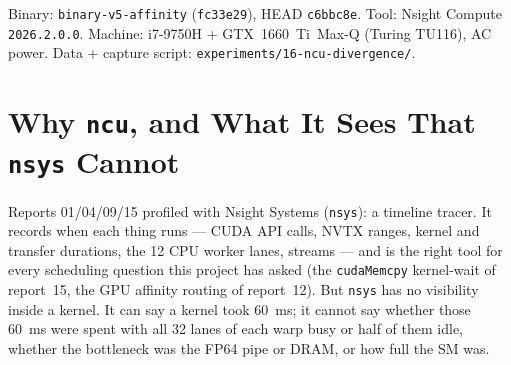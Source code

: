 \documentclass[
	english,
	letterpaper, oneside
]{article}
\begin{document}
\templatePagecfg
\templateFinalcfg

\inserttitle

\begin{center}\small\textsf{%
Binary: \texttt{binary-v5-affinity} (\texttt{fc33e29}), HEAD \texttt{c6bbc8e}.
Tool: Nsight Compute \texttt{2026.2.0.0}. Machine: i7-9750H + GTX~1660~Ti~Max-Q
(Turing TU116), AC power. Data + capture script:
\texttt{experiments/16-ncu-divergence/}.%
}\end{center}

\begin{abstract}
This report uses NVIDIA Nsight Compute (\texttt{ncu}) to measure, for the first
time in this project, what happens inside the GPU kernel --- warp
execution efficiency, branch divergence, FP64 pipe utilisation, occupancy, and
the compute/memory roofline --- across four content regimes (interior, exterior,
boundary, canonical), each run GPU-only so the single GPU thread is forced to
process every region type. The headline: the coherent regions the affinity
queue actually routes to the GPU run at exactly 100.0\,\% warp execution
efficiency and 100.0\,\% branch efficiency --- zero divergence, now measured
rather than argued (\texttt{11-priority-queue.tex}). They are FP64-bound
at 85.6\,\% of the double-precision peak ($\sim$110 of 129~GFLOPS at the measured
1.34~GHz on the 1:32 TU116), at 98.9\,\% occupancy with $\sim$0\,\% memory
traffic; the 15\,\% gap is the dependent iteration recurrence (long-scoreboard
stalls, uniform across all regimes), not divergence. Divergence is real
but confined to the pixel-floor boundary leaves (240$\times$135 down to
33.7\,\%; 480$\times$270 leaves 99.9\,\%): the uniformity test doubles as a
coherence filter. This corrects report~11's $\sim$40\,\% FP64 estimate and closes
the divergence question --- the GPU lever was never divergence.
\end{abstract}

\section{Why \texttt{ncu}, and What It Sees That \texttt{nsys} Cannot}

Reports 01/04/09/15 profiled with Nsight Systems (\texttt{nsys}): a
timeline tracer. It records when each thing runs --- CUDA API calls, NVTX
ranges, kernel and transfer durations, the 12 CPU worker lanes, streams
--- and is the right tool for every scheduling question this project has
asked (the \texttt{cudaMemcpy} kernel-wait of report~15, the GPU affinity routing
of report~12). But \texttt{nsys} has no visibility inside a kernel. It can
say a kernel took 60~ms; it cannot say whether those 60~ms were spent with all 32
lanes of each warp busy or half of them idle, whether the bottleneck was the FP64
pipe or DRAM, or how full the SM was.
\end{document}
